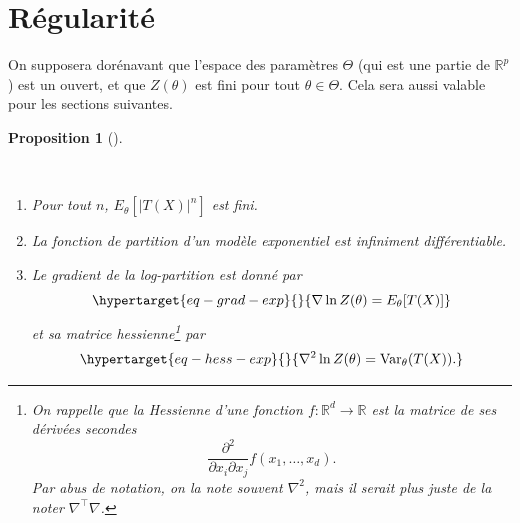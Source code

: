 \documentclass[
  10,
  letterpaper,
  DIV=11,
  numbers=noendperiod]{scrreport}
\theoremstyle{plain}
\theoremstyle{definition}
\theoremstyle{plain}
\newtheorem{proposition}{Proposition}[chapter]
\theoremstyle{definition}
\theoremstyle{definition}
\theoremstyle{plain}
\theoremstyle{remark}
\begin{document}
\hypertarget{ruxe9gularituxe9}{%
\section{Régularité}\label{ruxe9gularituxe9}}

On supposera dorénavant que l'espace des paramètres \(\Theta\) (qui est
une partie de \(\mathbb{R}^p\)) est un ouvert, et que \(Z(\theta)\) est
fini pour tout \(\theta \in \Theta\). Cela sera aussi valable pour les
sections suivantes.

\begin{proposition}[]\protect\hypertarget{prp-reg}{}\label{prp-reg}

~

\begin{enumerate}
\def\labelenumi{\arabic{enumi})}
\item
  Pour tout \(n\), \(E_\theta[|T(X)|^n]\) est fini.
\item
  La fonction de partition d'un modèle exponentiel est infiniment
  différentiable.
\item
  Le gradient de la log-partition est donné par
  \begin{equation}\protect\hypertarget{eq-grad-exp}{}{\nabla \ln Z(\theta) = E_\theta[T(X)]}\label{eq-grad-exp}\end{equation}
  et sa matrice hessienne\footnote{On rappelle que la Hessienne d'une
    fonction \(f:\mathbb{R}^d \to \mathbb{R}\) est la matrice de ses
    dérivées secondes
    \[\frac{\partial^2}{\partial x_i \partial x_j}f(x_1, \dotsc, x_d).\]
    Par abus de notation, on la note souvent \(\nabla^2\), mais il
    serait plus juste de la noter \(\nabla^\top \nabla\).} par
  \begin{equation}\protect\hypertarget{eq-hess-exp}{}{ \nabla^2 \ln Z(\theta) = \mathrm{Var}_\theta(T(X)).}\label{eq-hess-exp}\end{equation}
\end{enumerate}

\end{proposition}
\end{document}
